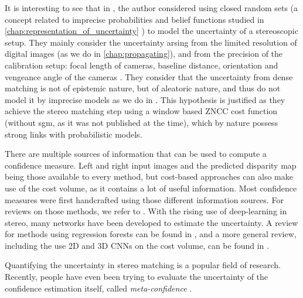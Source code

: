 \begin{remark}
    It is interesting to see that in \cite{quinio_random_1992}, the author considered using closed random sets (a concept related to imprecise probabilities and belief functions studied in \cref{chap:representation_of_uncertainty} \cite{quinio_random_1991}) to model the uncertainty of a stereoscopic setup. They mainly consider the uncertainty arsing from the limited resolution of digital images (as we do in \cref{chap:propagating}), and from the precision of the calibration setup: focal length of cameras, baseline distance, orientation and vengeance angle of the cameras \etc. They consider that the uncertainty from dense matching is not of epistemic nature, but of aleatoric nature, and thus do not model it by imprecise models as we do in . This hypothesis is justified as they achieve the stereo matching step using a window based ZNCC cost function (without \acrshort{sgm}, as it was not published at the time), which by nature possess strong links with probabilistic models.
\end{remark}

There are multiple sources of information that can be used to compute a confidence measure. Left and right input images and the predicted disparity map being those available to every method, but cost-based approaches can also make use of the cost volume, as it contains a lot of useful information. Most confidence measures were first handcrafted using those different information sources. For reviews on those methods, we refer to \cite{egnal_stereo_2004, hu_quantitative_2012, poggi_quantitative_2017}. With the rising use of deep-learning in stereo, many networks have been developed to estimate the uncertainty. A review for methods using regression forests can be found in \cite{min-gyu_park_leveraging_2015}, and a more general review, including the use 2D and 3D CNNs on the cost volume, can be found in \cite{poggi_confidence_2021}.

\begin{remark}
     Quantifying the uncertainty in stereo matching is a popular field of research. Recently, people have even been trying to evaluate the uncertainty of the confidence estimation itself, called \textit{meta-confidence} \cite{kim_meta-confidence_2022}.
\end{remark}

